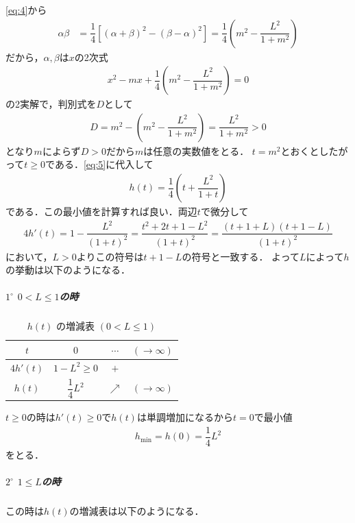 \documentclass[../../main.tex]{subfiles}
\begin{document}
\cref{eq:4}から
\begin{align}
  \alpha\beta
  & =\dfrac{1}{4}\left[(\alpha+\beta)^2-(\beta-\alpha)^2\right]
  =\dfrac{1}{4}\left(m^2-\dfrac{L^2}{1+m^2}\right)
\end{align}
だから，$\alpha,\beta$は$x$の2次式
\begin{align}
  x^2-mx+\dfrac{1}{4}\left(m^2-\dfrac{L^2}{1+m^2}\right)=0
\end{align}
の2実解で，判別式を$D$として
\begin{align}
  D=m^2-\left(m^2-\dfrac{L^2}{1+m^2}\right)=\dfrac{L^2}{1+m^2}>0
\end{align}
となり$m$によらず$D>0$だから$m$は任意の実数値をとる．
$t=m^2$とおくとしたがって$t\ge0$である．\cref{eq:5}に代入して
\begin{align}
  h(t)=\dfrac{1}{4}\left(t+\dfrac{L^2}{1+t}\right)
\end{align}
である．この最小値を計算すれば良い．両辺$t$で微分して
\begin{align}
  4h'(t)
  =1-\dfrac{L^2}{(1+t)^2}
  =\dfrac{t^2+2t+1-L^2}{(1+t)^2}
  = \dfrac{(t+1+L)(t+1-L)}{(1+t)^2}
\end{align}
において，$L>0$よりこの符号は$t+1-L$の符号と一致する．
よって$L$によって$h$の挙動は以下のようになる．

\subparagraph{$1^\circ$ $0<L \le 1$の時}

\begin{table}[htb]
  \centering
  \caption{$h(t)$ の増減表 $(0 < L \le 1)$}
  \label{tab:ht_case1}
  \renewcommand{\arraystretch}{1.5}
  \begin{tabular}{c|ccc}
    \hline
    $t$      & $0$                  & $\cdots$   & $(\to\infty)$ \\ \hline
    $4h'(t)$ & $1 - L^2 \ge 0$      & $+$        &               \\ \hline
    $h(t)$   & $\dfrac{1}{4}L^2$    & $\nearrow$ & $(\to\infty)$ \\ \hline
  \end{tabular}
\end{table}

$t\ge 0$の時は$h'(t)\ge 0$で$h(t)$は単調増加になるから$t=0$で最小値
\begin{align}
  h_{\min}=h(0) = \dfrac{1}{4}L^2 \label{eq:6}
\end{align}
をとる．

\subparagraph{$2^\circ$ $1\le L$の時}

この時は$h(t)$の増減表は以下のようになる．
\end{document}
